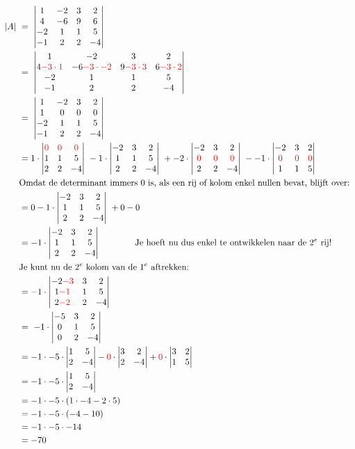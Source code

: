 	\begin{align*}
	|A|  \ & = \ \detvier{1 & -2 & 3 & 2 }
	{ 4 & -6 & 9 & 6  }
	{  -2 & 1 & 1 & 5 }
	{ -1 & 2 & 2 & -4 } \\
    \ & = \ \detvier{1 & -2 & 3 & 2 }
	{ 4\red{-3\cdot1} & -6\red{-3\cdot-2} & 9\red{-3\cdot3} & 6\red{-3\cdot2}  }
	{  -2 & 1 & 1 & 5 }
	{ -1 & 2 & 2 & -4 } \\
	  & = \ \detvier{1 & -2 & 3 & 2  }
	{ 1 & 0 &  0 & 0 }
	{  -2 & 1 & 1 & 5 }
	{ -1 & 2 & 2 & -4 } \\%
	& = 1\cdot \detdrie{ \red{0} & \red{0} & \red{0} }{1 & 1 & 5 }{ 2 & 2 & -4 }\ 
    -1\cdot  \detdrie{ -2 & 3 & 2 }{1 & 1 & 5 }{ 2 & 2 & -4 }\ %
    +-2\cdot \detdrie{ -2 & 3 & 2 }{\red{0} & \red{0} & \red{0} }{ 2 & 2 & -4 }\ 
    --1\cdot \detdrie{ -2 & 3 & 2 }{\red{0} & \red{0} & \red{0} }{ 1 & 1 & 5 } \\
    &\text{Omdat de determinant immers $0$ is, als een rij of kolom enkel nullen bevat, blijft over: } \\
    &= 0 -1\cdot  \detdrie{ -2 & 3 & 2 }{1 & 1 & 5 }{ 2 & 2 & -4 }\ + 0 - 0\\
    &= -1\cdot  \detdrie{ -2 & 3 & 2 }{1 & 1 & 5 }{ 2 & 2 & -4 }\qquad \qquad \text{Je hoeft nu dus enkel te ontwikkelen naar de } 2^e \text{ rij!}\\
    &\text{Je kunt nu de } 2^e \text{ kolom van de } 1^e \text{ aftrekken: } \\ 
    &= -1\cdot  \detdrie{ -2 \red{-3} & 3 & 2 }{1 \red{-1} & 1 & 5 }{ 2\red{-2} & 2 & -4 }\\
    &= \ -1\cdot \detdrie{ -5 & 3 & 2 }{0 & 1 & 5 }{ 0 & 2 & -4 }\ \\ 
    &= -1\cdot -5\cdot \dettwee{1&5}{2&-4} - \red{0}\cdot \dettwee{3&2}{2&-4} + \red{0}\cdot\dettwee{3&2}{1&5}\\
    &= -1\cdot -5\cdot \dettwee{1&5}{2&-4}\\
    &= -1\cdot -5\cdot (1\cdot -4 -2\cdot 5) \\
    &= -1\cdot -5\cdot (-4 -10) \\
    &= -1\cdot -5\cdot -14 \\
    &= -70 \\
	\end{align*}

